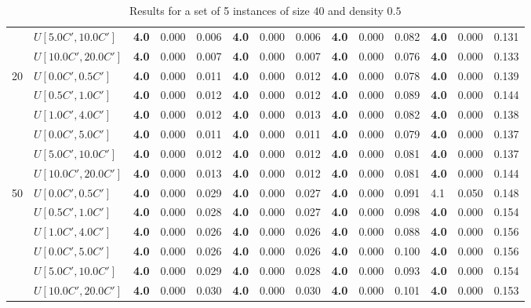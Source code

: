 \begin{table}[h]
{\begin{tabular}{|l|l||l|l|l||l|l|l||l|l|l||l|l|l|}
       & $U[5.0C',10.0C']$ & \textbf{4.0} & 0.000 & 0.006 & \textbf{4.0} & 0.000 & 0.006 & \textbf{4.0} & 0.000 & 0.082 & \textbf{4.0} & 0.000 & 0.131 \\
       & $U[10.0C',20.0C']$ & \textbf{4.0} & 0.000 & 0.007 & \textbf{4.0} & 0.000 & 0.007 & \textbf{4.0} & 0.000 & 0.076 & \textbf{4.0} & 0.000 & 0.133 \\
      \hline\hline
      \multirow{6}{*}{20} & $U[0.0C',0.5C']$ & \textbf{4.0} & 0.000 & 0.011 & \textbf{4.0} & 0.000 & 0.012 & \textbf{4.0} & 0.000 & 0.078 & \textbf{4.0} & 0.000 & 0.139 \\
       & $U[0.5C',1.0C']$ & \textbf{4.0} & 0.000 & 0.012 & \textbf{4.0} & 0.000 & 0.012 & \textbf{4.0} & 0.000 & 0.089 & \textbf{4.0} & 0.000 & 0.144 \\
       & $U[1.0C',4.0C']$ & \textbf{4.0} & 0.000 & 0.012 & \textbf{4.0} & 0.000 & 0.013 & \textbf{4.0} & 0.000 & 0.082 & \textbf{4.0} & 0.000 & 0.138 \\
       & $U[0.0C',5.0C']$ & \textbf{4.0} & 0.000 & 0.011 & \textbf{4.0} & 0.000 & 0.011 & \textbf{4.0} & 0.000 & 0.079 & \textbf{4.0} & 0.000 & 0.137 \\
       & $U[5.0C',10.0C']$ & \textbf{4.0} & 0.000 & 0.012 & \textbf{4.0} & 0.000 & 0.012 & \textbf{4.0} & 0.000 & 0.081 & \textbf{4.0} & 0.000 & 0.137 \\
       & $U[10.0C',20.0C']$ & \textbf{4.0} & 0.000 & 0.013 & \textbf{4.0} & 0.000 & 0.012 & \textbf{4.0} & 0.000 & 0.081 & \textbf{4.0} & 0.000 & 0.144 \\
      \hline\hline
      \multirow{6}{*}{50} & $U[0.0C',0.5C']$ & \textbf{4.0} & 0.000 & 0.029 & \textbf{4.0} & 0.000 & 0.027 & \textbf{4.0} & 0.000 & 0.091 & 4.1 & 0.050 & 0.148 \\
       & $U[0.5C',1.0C']$ & \textbf{4.0} & 0.000 & 0.028 & \textbf{4.0} & 0.000 & 0.027 & \textbf{4.0} & 0.000 & 0.098 & \textbf{4.0} & 0.000 & 0.154 \\
       & $U[1.0C',4.0C']$ & \textbf{4.0} & 0.000 & 0.026 & \textbf{4.0} & 0.000 & 0.026 & \textbf{4.0} & 0.000 & 0.088 & \textbf{4.0} & 0.000 & 0.156 \\
       & $U[0.0C',5.0C']$ & \textbf{4.0} & 0.000 & 0.026 & \textbf{4.0} & 0.000 & 0.026 & \textbf{4.0} & 0.000 & 0.100 & \textbf{4.0} & 0.000 & 0.156 \\
       & $U[5.0C',10.0C']$ & \textbf{4.0} & 0.000 & 0.029 & \textbf{4.0} & 0.000 & 0.028 & \textbf{4.0} & 0.000 & 0.093 & \textbf{4.0} & 0.000 & 0.154 \\
       & $U[10.0C',20.0C']$ & \textbf{4.0} & 0.000 & 0.030 & \textbf{4.0} & 0.000 & 0.030 & \textbf{4.0} & 0.000 & 0.101 & \textbf{4.0} & 0.000 & 0.153 \\
      \hline
      \end{tabular}
      }
      \caption{Results for a set of 5 instances of size $40$ and density $0.5$}
      \label{tab:pcpn40}\end{table}



